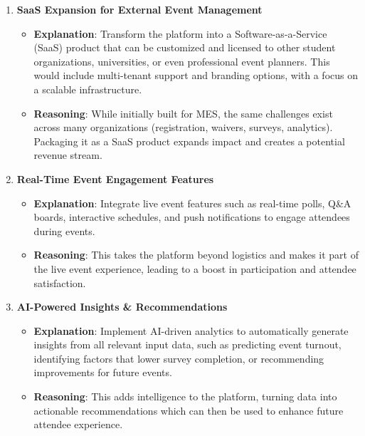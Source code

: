 \documentclass{article}
\begin{document}
\begin{enumerate}[align=left,
  leftmargin=*,
  itemindent=0em,
  label=\bfseries SG-\arabic*:]
    \item \textbf{SaaS Expansion for External Event Management}
    \begin{itemize}
        \item \textbf{Explanation}: Transform the platform into a Software-as-a-Service (SaaS) product that can be customized and licensed to other student organizations, universities, or even professional event planners. This would include multi-tenant support and branding options, with a focus on a scalable infrastructure.
        \item \textbf{Reasoning}: While initially built for MES, the same challenges exist across many organizations (registration, waivers, surveys, analytics). Packaging it as a SaaS product expands impact and creates a potential revenue stream.
    \end{itemize}

        \item \textbf{Real-Time Event Engagement Features}
    \begin{itemize}
        \item \textbf{Explanation}: Integrate live event features such as real-time polls, Q\&A boards, interactive schedules, and push notifications to engage attendees during events.
        \item \textbf{Reasoning}: This takes the platform beyond logistics and makes it part of the live event experience, leading to a boost in participation and attendee satisfaction.
    \end{itemize}

        \item \textbf{AI-Powered Insights \& Recommendations}
    \begin{itemize}
        \item \textbf{Explanation}: Implement AI-driven analytics to automatically generate insights from all relevant input data, such as predicting event turnout, identifying factors that lower survey completion, or recommending improvements for future events.
        \item \textbf{Reasoning}: This adds intelligence to the platform, turning data into actionable recommendations which can then be used to enhance future attendee experience.
    \end{itemize}
\end{enumerate}
\end{document}
